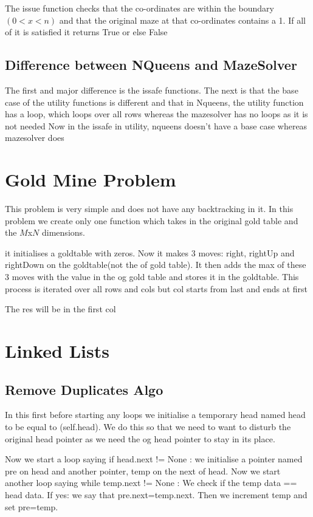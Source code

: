 \documentclass{article}
\newcommand{\nd}{\noindent}
\begin{document}
\nd The issue function checks that the co-ordinates are within the boundary $(0<x<n)$ and that the original maze at that co-ordinates contains a 1. If all of it is satisfied it returns True or else False

\subsection{Difference between NQueens and MazeSolver}
The first and major difference is the issafe functions. The next is that the base case of the utility functions is different and that in Nqueens, the utility function has a loop, which loops over all rows whereas the mazesolver has no loops as it is not needed
Now in the issafe in utility, nqueens doesn’t have a base case whereas mazesolver does 

\section{Gold Mine Problem}
This problem is very simple and does not have any backtracking in it. In this problem we create only one function which takes in the original gold table and the $M$x$N$ dimensions.

\nd it initialises a goldtable with zeros. 
Now it makes 3 moves: right, rightUp and rightDown on the goldtable(not the of gold table). It then adds the max of these 3 moves with the value in the og gold table and stores it in the goldtable. This process is iterated over all rows and cols but col starts from last and ends at first

\nd The res will be in the first col 

\section{Linked Lists}
\subsection{Remove Duplicates Algo}
In this first before starting any loops we initialise a temporary head named head to be equal to (self.head). We do this so that we need to want 
to disturb the original head pointer as we need the og head pointer to stay in its place. 

\nd Now we start a loop saying if head.next != None : we initialise a pointer named pre on head and another pointer, temp on the next of head. Now we start another loop saying 
while temp.next != None : We check if the temp data == head data. If yes: we say that pre.next=temp.next. Then we increment temp and set pre=temp. 
\end{document}
